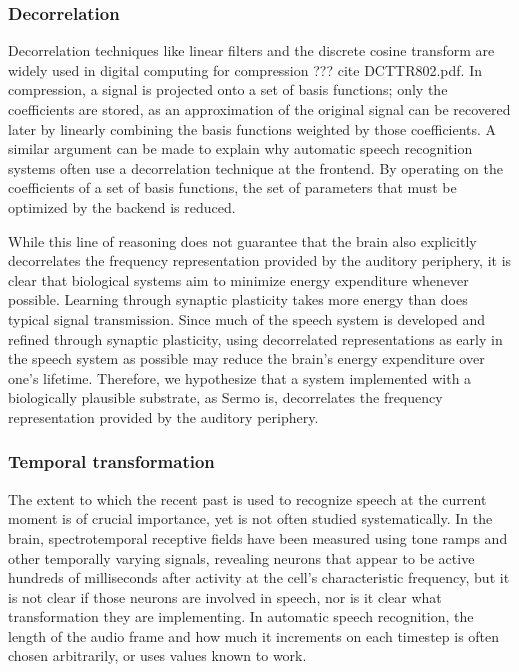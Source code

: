 \subsubsection{Decorrelation}

Decorrelation techniques like
linear filters and the discrete cosine transform
are widely used in digital computing
for compression ??? cite DCTTR802.pdf.
In compression, a signal is projected
onto a set of basis functions;
only the coefficients are stored,
as an approximation of the original signal
can be recovered later by linearly combining
the basis functions weighted by those coefficients.
A similar argument can be made
to explain why automatic speech recognition systems
often use a decorrelation technique
at the frontend.
By operating on the coefficients of a set
of basis functions,
the set of parameters that must be optimized
by the backend is reduced.

While this line of reasoning
does not guarantee that
the brain also explicitly decorrelates
the frequency representation
provided by the auditory periphery,
it is clear that biological systems
aim to minimize energy expenditure whenever possible.
Learning through synaptic plasticity
takes more energy than does
typical signal transmission.
Since much of the speech system
is developed and refined
through synaptic plasticity,
using decorrelated representations
as early in the speech system as possible
may reduce the brain's energy expenditure
over one's lifetime.
Therefore, we hypothesize
that a system implemented
with a biologically plausible substrate,
as Sermo is,
decorrelates the frequency representation
provided by the auditory periphery.

\subsubsection{Temporal transformation}

The extent to which the recent past
is used to recognize speech
at the current moment
is of crucial importance,
yet is not often studied systematically.
In the brain, spectrotemporal receptive fields
have been measured using
tone ramps and other temporally varying signals,
revealing neurons that appear to be active
hundreds of milliseconds
after activity at
the cell's characteristic frequency,
but it is not clear if those
neurons are involved in speech,
nor is it clear what transformation they are implementing.
In automatic speech recognition,
the length of the audio frame
and how much it increments on each timestep
is often chosen arbitrarily,
or uses values known to work.

